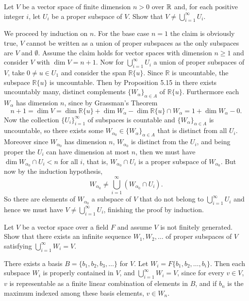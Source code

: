 \medskip

\begin{problem}[Golan 199]
Let $V$ be a vector space of finite dimension $n>0$ over $\mathbb{R}$ and, for each
positive integer $i$, let $U_i$ be a proper subspace of $V$.  
Show that $V \neq \bigcup_{i=1}^\infty U_i$.
\end{problem}
 \smallskip
 \begin{solution}
 We proceed by induction on $n$. For the base case $n=1$ the claim is obviously true, $V$ cannot be written as a union of proper subspaces as the only subspaces are $V$ and $\emptyset$. Assume the claim holds for vector spaces with dimension $n \geq 1$ and consider $V$ with $\dim{V} = n+1$. Now for $\bigcup_{i=1}^\infty U_i$ a union of proper subspaces of $V$, take $0 \neq u \in U_1$ and consider the span $\mathbb{R}\{u\}$. Since $\mathbb{R}$ is uncountable, the subspace $\mathbb{R}\{u\}$ is uncountable. Then by Proposition 5.15 in \cite{Golan:2012} there exists uncountably many, distinct complements $\{W_\alpha \}_{\alpha \in A}$ of $\mathbb{R}\{u\}$. Furthermore each $W_\alpha$ has dimension $n$, since by Grassman's Theorem
 $$
n+1 = \dim{V} = \dim{\mathbb{R}\{u\}} + \dim{W_\alpha} - \dim{\mathbb{R}\{u\}\cap W_\alpha} = 1 + \dim{W_\alpha} - 0.
 $$
 Now the collection $\{U_i\}_{i=1}^\infty$ of subspaces is countable and $\{W_\alpha \}_{\alpha \in A}$ is uncountable, so there exists some $W_{\alpha _0} \in \{W_\alpha \}_{\alpha \in A}$ that is distinct from all $U_i$. Moreover since $W_{\alpha _0}$ has dimension $n$, $W_{\alpha _0}$ is distinct from the $U_i$, and being proper the $U_i$ can have dimension at most $n$, then we must have $\dim{W_{\alpha _0} \cap U_i} < n$ for all $i$, that is, $W_{\alpha _0} \cap U_i$ is a proper subspace of $W_{\alpha _0}$. But now by the induction hypothesis, 
 $$
W_{\alpha _0} \neq \bigcup _{i=1}^\infty (W_{\alpha _0} \cap U_i).
 $$
 So there are elements of $W_{\alpha _0}$ a subspace of $V$ that do not belong to $\bigcup_{i=1}^\infty U_i$ and hence we must have $V \neq \bigcup_{i=1}^\infty U_i$, finishing the proof by induction.
 \end{solution}

\probskip

\begin{problem}[Golan 210]
Let $V$ be a vector space over a field $F$ and assume $V$ is not finitely
generated.  Show that there exists an infinite sequence $W_1, W_2, \dots$ of
proper subspaces of $V$ satisfying $\bigcup_{i=1}^\infty W_i = V$.
\end{problem}
\smallskip
\begin{solution}
There exists a basis $B = \{b_1,b_2,b_3,\dots\}$ for $V$. Let $W_i = F\{b_1,b_2,\dots,b_i\}$.  Then 
each subspace $W_i$ is properly contained in $V$, and $\bigcup_{i=1}^\infty W_i = V$, since for every 
$v\in V$, $v$ is representable as a finite linear combination of elements in $B$, and if $b_n$ is the maximum 
indexed among these basis elements, $v\in W_n$.
\end{solution}

